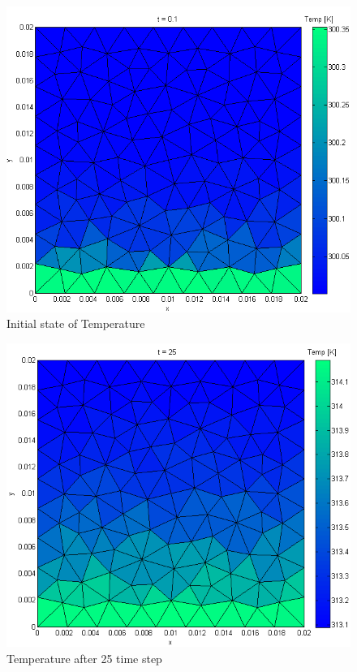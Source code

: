 \documentclass[12pt]{article}
\begin{document}
	\begin{figure}[H]
    \includegraphics[scale=0.5]{matlab-results/1.png}
    \centering
    \caption{Initial state of Temperature}
	\end{figure}	
	\begin{figure}[H]
    \includegraphics[scale=0.5]{matlab-results/2.png}
    \centering
    \caption{Temperature after 25 time step}
	\end{figure}	
\end{document}
